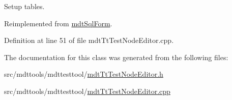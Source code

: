 Setup tables. 



Reimplemented from \hyperlink{classmdt_sql_form_a27fe6e45aa5d4d7782aad9833e6de20b}{mdt\-Sql\-Form}.



Definition at line 51 of file mdt\-Tt\-Test\-Node\-Editor.\-cpp.



The documentation for this class was generated from the following files\-:\begin{DoxyCompactItemize}
\item 
src/mdttools/mdttesttool/\hyperlink{mdt_tt_test_node_editor_8h}{mdt\-Tt\-Test\-Node\-Editor.\-h}\item 
src/mdttools/mdttesttool/\hyperlink{mdt_tt_test_node_editor_8cpp}{mdt\-Tt\-Test\-Node\-Editor.\-cpp}\end{DoxyCompactItemize}
